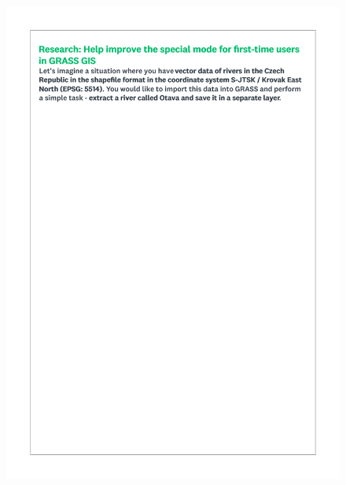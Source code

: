 \documentclass[a4paper,10pt,twoside]{article}
\begin{document}
 \newpage
 \begin{figure}[hbt!]
 \begin{center}
 \includegraphics[width=16cm]{../surveys/questionnaires/survey2-page2_task.pdf}
 \end{center}
 \end{figure}
 
\end{document}
